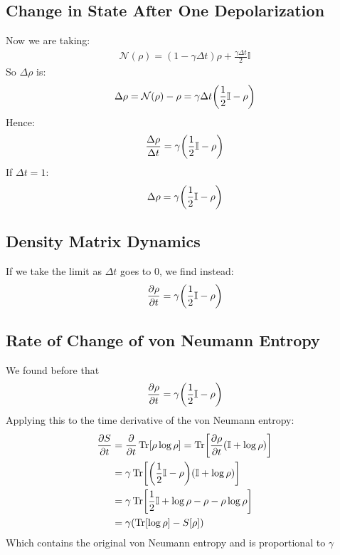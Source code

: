 \documentclass[12pt]{article}
\begin{document}
\subsection{Change in State After One Depolarization}
Now we are taking:
\begin{align*}
  \mathcal{N}(\rho)=(1-\gamma\Delta t)\rho+\frac{\gamma\Delta t}{2}\mathbb{I}
\end{align*}
So $\Delta\rho$ is:
\begin{align*}
  \Delta\rho=\mathcal{N}(\rho)-\rho=\gamma\Delta t\qty(\frac12\mathbb{I}-\rho)
\end{align*}
Hence:
\begin{align*}
  \frac{\Delta\rho}{\Delta t}=\gamma\qty(\frac12\mathbb{I}-\rho)
\end{align*}
If $\Delta t=1$:
\begin{align*}
  \Delta\rho=\gamma\qty(\frac12\mathbb{I}-\rho)
\end{align*}
\subsection{Density Matrix Dynamics}
If we take the limit as $\Delta{t}$ goes to 0, we find instead:
\begin{align*}
  \pdv{\rho}{t}=\gamma\qty(\frac12\mathbb{I}-\rho)
\end{align*}

\subsection{Rate of Change of von Neumann Entropy}
We found before that
\begin{align*}
  \pdv{\rho}{t}=\gamma\qty(\frac12\mathbb{I}-\rho)
\end{align*}
Applying this to the time derivative of the von Neumann entropy:
\begin{align*}
  \pdv{S}{t}&=\pdv{t}\Tr[\rho\log\rho]=\Tr[\pdv{\rho}{t}
  \qty(\mathbb{I}+\log\rho)]\\
  &=\gamma\Tr[\qty(\frac12\mathbb{I}-\rho)\qty(\mathbb{I}+\log\rho)]\\
  &=\gamma\Tr[\frac12\mathbb{I}+\log\rho-\rho-\rho\log\rho]\\
  &=\gamma\qty(\Tr[\log\rho]-S[\rho])
\end{align*}
Which contains the original von Neumann entropy and is proportional to $\gamma$
\end{document}
